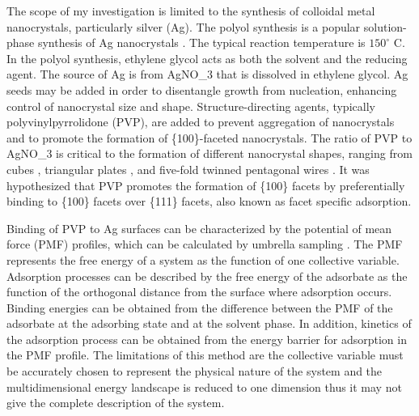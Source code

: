 
The scope of my investigation is limited to the synthesis of colloidal metal nanocrystals, particularly silver (Ag).
The polyol synthesis is a popular solution-phase synthesis of Ag nanocrystals \cite{Skrabalak_2007}.
The typical reaction temperature is $150^{\circ}$ C.
In the polyol synthesis, ethylene glycol acts as both the solvent and the reducing agent.
The source of Ag is from AgNO_3 that is dissolved in ethylene glycol.
Ag seeds may be added in order to disentangle growth from nucleation, enhancing control of nanocrystal size and shape.
Structure-directing agents, typically polyvinylpyrrolidone (PVP), are added to prevent aggregation of nanocrystals and to promote the formation of \{100\}-faceted nanocrystals.
The ratio of PVP to AgNO_3 is critical to the formation of different nanocrystal shapes, ranging from cubes \cite{Xia_2012,Zhang_2010}, triangular plates \cite{Lofton_2005,Liu_2012}, and five-fold twinned pentagonal wires \cite{Zhu_2011,Zhang_2008,Sun_2002}.
It was hypothesized that PVP promotes the formation of \{100\} facets by preferentially binding to \{100\} facets over \{111\} facets\cite{Xia_2012,Sun_2002}, also known as facet specific adsorption.

Binding of PVP to Ag surfaces can be characterized by the potential of mean force (PMF) profiles, which can be calculated by umbrella sampling \cite{Torrie_1977,K_stner_2011}.
The PMF represents the free energy of a system as the function of one collective variable.
Adsorption processes can be described by the free energy of the adsorbate as the function of the orthogonal distance from the surface where adsorption occurs.
Binding energies can be obtained from the difference between the PMF of the adsorbate at the adsorbing state and at the solvent phase.
In addition, kinetics of the adsorption process can be obtained from the energy barrier for adsorption in the PMF profile.
The limitations of this method are the collective variable must be accurately chosen to represent the physical nature of the system and the multidimensional energy landscape is reduced to one dimension thus it may not give the complete description of the system.
  
  
  